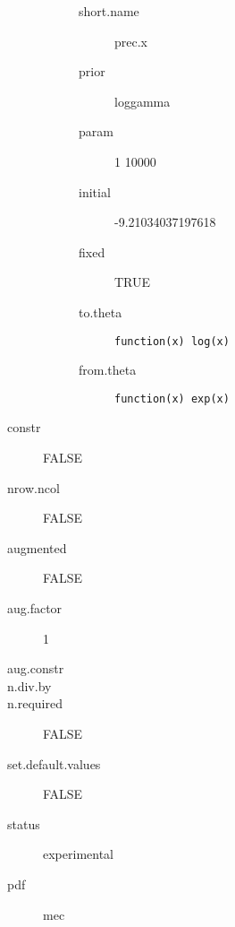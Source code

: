 \begin{description}
\begin{description}
\begin{description}
	 	 	\item[short.name] prec.x
	 	 	\item[prior] loggamma
	 	 	\item[param] 1 10000
	 	 	\item[initial] -9.21034037197618
	 	 	\item[fixed] TRUE
	 	 	\item[to.theta] \verb|function(x) log(x)|
	 	 	\item[from.theta] \verb|function(x) exp(x)|
	 	 \end{description}
	 \end{description}
	\item[constr] FALSE
	\item[nrow.ncol] FALSE
	\item[augmented] FALSE
	\item[aug.factor] 1
	\item[aug.constr] 
	\item[n.div.by] 
	\item[n.required] FALSE
	\item[set.default.values] FALSE
	\item[status] experimental
	\item[pdf] mec
\end{description}
